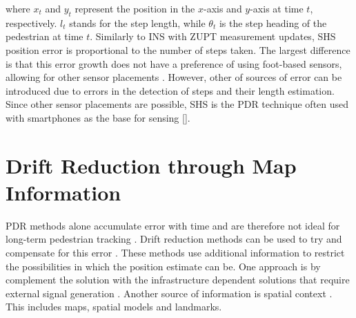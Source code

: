 where $x_{t}$  and  $y_{t}$ represent the position in the $x$-axis and $y$-axis at time  $t$, respectively. $l_{t}$ stands for the step length, while $\theta_{t}$ is the step heading of the pedestrian at time $t$.
Similarly to INS with ZUPT measurement updates, SHS position error is proportional to the number of steps taken. The largest difference is that this error growth does not have a preference of using foot-based sensors, allowing for other sensor placements \cite{Diez2018b}. However, other of sources of error can be introduced due to errors in the detection of steps and their length estimation.  Since other sensor placements are possible, SHS is the PDR technique often used with smartphones as the base for sensing [\qn]. 


\section{Drift Reduction through Map Information}
PDR methods alone accumulate error with time and are therefore not ideal for long-term pedestrian tracking \cite{Hardegger2012}. Drift reduction methods can be used to try and compensate for this error \cite{MunozDiaz2019a}.  These methods use additional information to restrict the possibilities in which the position estimate can be. One approach is by complement the solution with the infrastructure dependent solutions that require external signal generation \cite{Gu2019}. Another source of information is spatial context \cite{Gu2019}. This includes maps, spatial models and landmarks.

